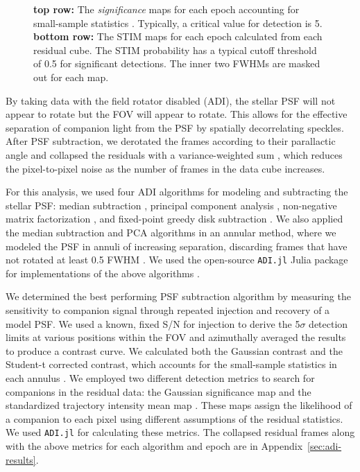 \documentclass[twocolumn]{aastex631}
\begin{document}
\begin{figure*}
    \centering
    \caption{\textbf{top row:} The \textit{significance} maps for each epoch accounting for small-sample statistics \citep{mawetFundamentalLimitationsHigh2014}. Typically, a critical value for detection is 5. \textbf{bottom row:} The STIM maps for each epoch calculated from each residual cube. The STIM probability has a typical cutoff threshold of 0.5 for significant detections. The inner two FWHMs are masked out for each map.}
    \label{fig:detection}
\end{figure*}

By taking data with the field rotator disabled (ADI), the stellar PSF will not appear to rotate but the FOV will appear to rotate. This allows for the effective separation of companion light from the PSF by spatially decorrelating speckles.  After PSF subtraction, we derotated the frames according to their parallactic angle and collapsed the residuals with a variance-weighted sum \citep{bottomNoiseweightedAngularDifferential2017a}, which reduces the pixel-to-pixel noise as the number of frames in the data cube increases.

For this analysis, we used four ADI algorithms for modeling and subtracting the stellar PSF: median subtraction \citep{maroisAngularDifferentialImaging2006}, principal component analysis \citep[PCA, also referred to as KLIP;][]{soummerDetectionCharacterizationExoplanets2012a}, non-negative matrix factorization \citep[NMF;][]{renNonnegativeMatrixFactorization2018a}, and fixed-point greedy disk subtraction \citep[GreeDS;][]{pairetReferencelessAlgorithmCircumstellar2019a,pairetMAYONNAISEMorphologicalComponents2020}. We also applied the median subtraction and PCA algorithms in an annular method, where we modeled the PSF in annuli of increasing separation, discarding frames that have not rotated at least 0.5 FWHM \citep{maroisAngularDifferentialImaging2006}. We used the open-source \texttt{ADI.jl} Julia package for implementations of the above algorithms \citep{lucasADIJlJulia2020}.

We determined the best performing PSF subtraction algorithm by measuring the sensitivity to companion signal through repeated injection and recovery of a model PSF. We used a known, fixed S/N for injection to derive the 5$\sigma$ detection limits at various positions within the FOV and azimuthally averaged the results to produce a contrast curve. We calculated both the Gaussian contrast and the Student-t corrected contrast, which accounts for the small-sample statistics in each annulus \citep{mawetFundamentalLimitationsHigh2014}. We employed two different detection metrics to search for companions in the residual data: the Gaussian significance map \citep{mawetFundamentalLimitationsHigh2014} and the standardized trajectory intensity mean map \citep[STIM map;][]{pairetSTIMMapDetection2019}. These maps assign the likelihood of a companion to each pixel using different assumptions of the residual statistics. We used \texttt{ADI.jl} for calculating these metrics. The collapsed residual frames along with the above metrics for each algorithm and epoch are in Appendix~\ref{sec:adi-results}.
\end{document}
